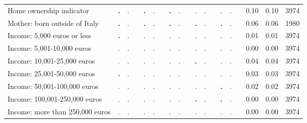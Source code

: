 \begin{tabular}{l c c c c c c c c c c c c c c c c c c}
Home ownership indicator & \textbf{        .} &         . & & \textbf{        .} &         . & & \textbf{        .} &         . & &         . &         . & &         . &         . & &      0.10 &      0.10 &      3974 \\
Mother: born outside of Italy & \textbf{        .} &         . & & \textbf{        .} &         . & & \textbf{        .} &         . & & \textbf{        .} &         . & & \textbf{        .} &         . & &      0.06 &      0.06 &      1980 \\
Income: 5,000 euros or less & \textbf{        .} &         . & &         . &         . & &         . &         . & &         . &         . & &         . &         . & &      0.01 &      0.01 &      3974 \\
Income: 5,001-10,000 euros &         . &         . & &         . &         . & &         . &         . & &         . &         . & &         . &         . & &      0.00 &      0.00 &      3974 \\
Income: 10,001-25,000 euros &         . &         . & &         . &         . & &         . &         . & & \textbf{        .} &         . & &         . &         . & &      0.04 &      0.04 &      3974 \\
Income: 25,001-50,000 euros & \textbf{        .} &         . & &         . &         . & &         . &         . & &         . &         . & &         . &         . & &      0.03 &      0.03 &      3974 \\
Income: 50,001-100,000 euros &         . &         . & &         . &         . & &         . &         . & &         . &         . & & \textbf{        .} &         . & &      0.02 &      0.02 &      3974 \\
Income: 100,001-250,000 euros &         . &         . & &         . &         . & &         . &         . & & \textbf{        .} &         . & & \textbf{        .} &         . & &      0.00 &      0.00 &      3974 \\
Income: more than 250,000 euros &         . &         . & &         . &         . & &         . &         . & &         . &         . & &         . &         . & &      0.00 &      0.00 &      3974 \\
\bottomrule
\end{tabular}
